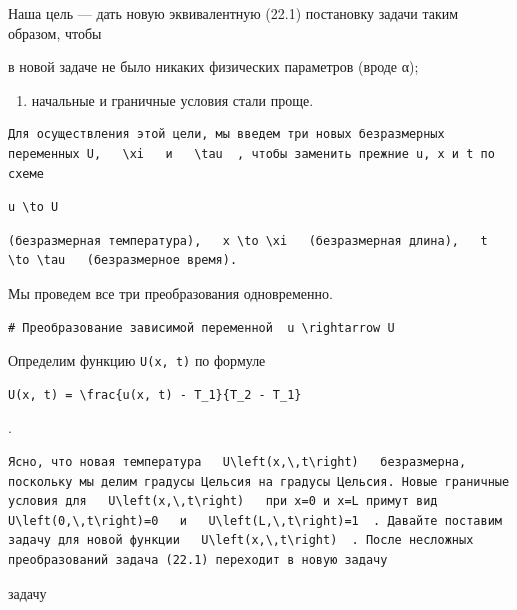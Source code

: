 \documentclass[
  ukrainian,
]{article}
\providecommand{\tightlist}{%
  \setlength{\itemsep}{0pt}\setlength{\parskip}{0pt}}
\begin{document}
Наша цель --- дать новую эквивалентную (22.1) постановку задачи таким
образом, чтобы

в новой задаче не было никаких физических параметров (вроде α);

\begin{enumerate}
\def\labelenumi{\arabic{enumi})}
\setcounter{enumi}{1}
\tightlist
\item
  начальные и граничные условия стали проще.
\end{enumerate}

\begin{verbatim}
Для осуществления этой цели, мы введем три новых безразмерных переменных U,   \xi   и   \tau  , чтобы заменить прежние u, x и t по схеме
\end{verbatim}

\begin{verbatim}
u \to U
\end{verbatim}

\begin{verbatim}
(безразмерная температура),   x \to \xi   (безразмерная длина),   t \to \tau   (безразмерное время).
\end{verbatim}

Мы проведем все три преобразования одновременно.

\begin{verbatim}
# Преобразование зависимой переменной  u \rightarrow U
\end{verbatim}

Определим функцию \texttt{U(x,\ t)} по формуле

\begin{verbatim}
U(x, t) = \frac{u(x, t) - T_1}{T_2 - T_1}
\end{verbatim}

.

\begin{verbatim}
Ясно, что новая температура   U\left(x,\,t\right)   безразмерна, поскольку мы делим градусы Цельсия на градусы Цельсия. Новые граничные условия для   U\left(x,\,t\right)   при x=0 и x=L примут вид   U\left(0,\,t\right)=0   и   U\left(L,\,t\right)=1  . Давайте поставим задачу для новой функции   U\left(x,\,t\right)  . После несложных преобразований задача (22.1) переходит в новую задачу
\end{verbatim}

задачу
\end{document}
